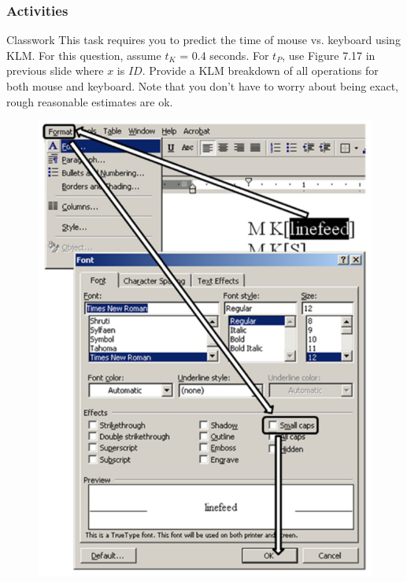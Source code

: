\documentclass{beamer}
\begin{document}
\begin{frame}
	\frametitle{Activities}
	\begin{block}{Classwork}
		\footnotesize
		This task requires you to predict the time of mouse vs. keyboard using KLM.  For this ques­tion, assume $t_{K}$ = 0.4 seconds.    For $t_{P}$, use Figure 7.17 in previous slide where $x$ is $ID$.   Provide a KLM break­down of all operations for both mouse and keyboard.      Note that you don't have to worry about being exact,   rough reasonable estimates are ok.
		\begin{figure}
			\includegraphics[width=.25\linewidth]{image/klm2}
		\end{figure}
	\end{block}
\end{frame}

%
%
%
%
%



\end{document}
